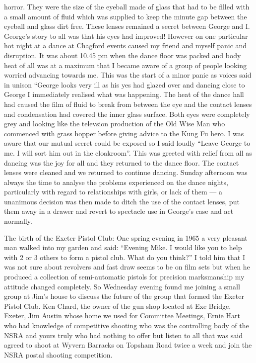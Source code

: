 horror. They were the size of the eyeball made of glass that had to be filled
with a small amount of fluid which was supplied to keep the minute gap between
the eyeball and glass dirt free. These lenses remained a secret between George
and I. George's story to all was that his eyes had improved! However on one
particular hot night at a dance at Chagford events caused my friend and myself
panic and disruption. It was about 10.45 pm when the dance floor was packed
and body heat of all was at a maximum that I became aware of a group of people
looking worried advancing towards me. This was the start of a minor panic as
voices said in unison ``George looks very ill as his yes had glazed over and
dancing close to George I immediately realised what was happening. The heat of
the dance hall had caused the film of fluid to break from between the eye and
the contact lenses and condensation had covered the inner glass surface. Both
eyes were completely grey and looking like the televsion production of the Old
Wise Man who commenced with         grass hopper before giving advice
to the Kung Fu hero. I was aware that our mutual secret could be exposed so I
said loudly ``Leave George to me. I will sort him out in the cloakroom''. This
was greeted with relief from all as dancing was the joy for all and they
returned to the dance floor. The contact lenses were cleaned and we returned to
continue dancing. Sunday afternoon was always the time to analyse the problems
experienced on the dance nights, particularly with regard to relationships with
girls, or lack of them --- a unanimous decision was then made to ditch the use
of the contact lenses, put them away in a drawer and revert to spectacle use in
George's case and act normally.

The birth of the Exeter Pistol Club: One spring evening in 1965 a very pleasant
man walked into my garden and said: ``Evening Mike. I would like you to help
with 2 or 3 others to form a pistol club. What do you think?'' I told him
that I was not sure about revolvers and fast draw seems to be on film sets but
when he produced a collection of semi-automatic pistols for precision
marksmanship my attitude changed completely. So Wednesday evening found me
joining a small group at Jim's house to discuss the future of the group that
formed the Exeter Pistol Club. Ken Chard, the owner of the gun shop located at
Exe Bridge, Exeter, Jim Austin whose home we used for Committee Meetings, Ernie
Hart who had knowledge of competitive shooting who was the controlling body of
the NSRA and yours truly who had nothing to offer but listen to all that was
said agreed to shoot at Wyvern Barracks on Topsham Road twice a week and join
the NSRA postal shooting competition.

